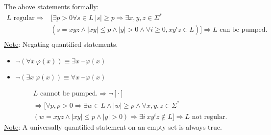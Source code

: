 \documentclass{article}
\begin{document}
\noindent The above statements formally:
\begin{align*}
    L \text{ regular} \Rightarrow &[\exists p > 0 \forall s \in L\ |s| \geq p \Rightarrow \exists x,y,z \in \Sigma^*\\ &(s = xyz \land |xy| \leq p \land |y| > 0 \land \forall i \geq 0, xy^iz \in L)] \Rightarrow L \text{ can be pumped.}\\
\end{align*}
\underline{Note}: Negating quantified statements.
\begin{itemize}
    \item $\neg(\forall x\ \varphi(x)) \equiv \exists x\ \neg\varphi(x)$
    \item $\neg(\exists x\ \varphi(x)) \equiv \forall x\ \neg\varphi(x)$
\end{itemize}
\begin{align*}
    &L \text{ cannot be pumped.} \Rightarrow \neg [\cdot]\\ &\Rightarrow
    [\forall p, p > 0 \Rightarrow \exists w \in L \land |w| \geq p \land \forall x,y,z \in \Sigma^*\\ &(w = xyz \land |xy| \leq p \land |y| > 0) \Rightarrow \exists i\ xy^iz \notin L] \Rightarrow L \text{ not regular.}
\end{align*}
\underline{Note}: A universally quantified statement on an empty set is always true.
\end{document}

